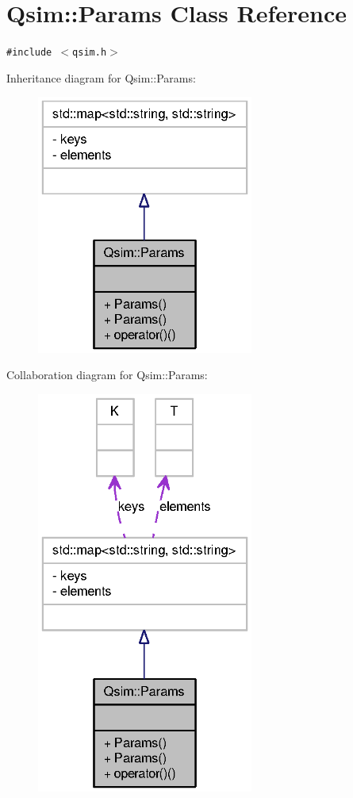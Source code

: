 \section{Qsim::Params Class Reference}
\label{classQsim_1_1Params}
{\tt \#include $<$qsim.h$>$}

Inheritance diagram for Qsim::Params:\nopagebreak
\begin{figure}[H]
\begin{center}
\leavevmode
\includegraphics[width=202pt]{classQsim_1_1Params__inherit__graph}
\end{center}
\end{figure}
Collaboration diagram for Qsim::Params:\nopagebreak
\begin{figure}[H]
\begin{center}
\leavevmode
\includegraphics[width=202pt]{classQsim_1_1Params__coll__graph}
\end{center}
\end{figure}
